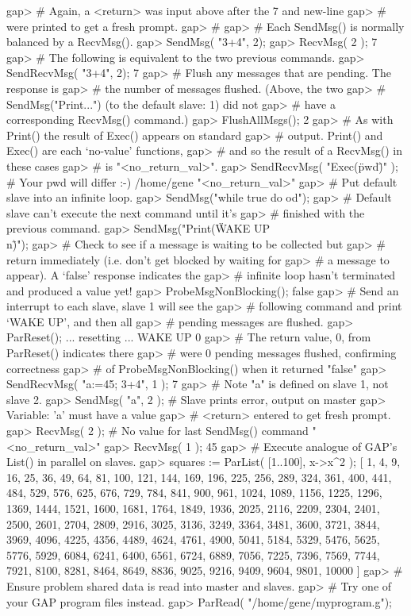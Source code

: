 gap> # Again, a <return> was input above after the 7 and new-line
gap> # were printed to get a fresh prompt.
gap> #
gap> # Each SendMsg() is normally balanced by a RecvMsg().
gap> SendMsg( "3+4", 2);
gap> RecvMsg( 2 );
7
gap> # The following is equivalent to the two previous commands.
gap> SendRecvMsg( "3+4", 2);
7
gap> # Flush any messages that are pending. The response is
gap> # the number of messages flushed. (Above, the two
gap> # SendMsg("Print...") (to the default slave: 1) did not
gap> # have a corresponding RecvMsg() command.)
gap> FlushAllMsgs();
2
gap> # As with Print() the result of Exec() appears on standard
gap> # output. Print() and Exec() are each `no-value' functions,
gap> # and so the result of a RecvMsg() in these cases
gap> # is "<no_return_val>".
gap> SendRecvMsg( "Exec(\"pwd\")" ); # Your pwd will differ :-)
/home/gene
"<no_return_val>"
gap> # Put default slave into an infinite loop.
gap> SendMsg("while true do od");
gap> # Default slave can't execute the next command until it's 
gap> # finished with the previous command.
gap> SendMsg("Print(\"WAKE UP\\n\")");
gap> # Check to see if a message is waiting to be collected but
gap> # return immediately (i.e. don't get blocked by waiting for
gap> # a message to appear). A `false' response indicates the
gap> # infinite loop hasn't terminated and produced a value yet!
gap> ProbeMsgNonBlocking();
false
gap> # Send an interrupt to each slave, slave 1 will see the
gap> # following command and print `WAKE UP', and then all
gap> # pending messages are flushed.
gap> ParReset();
... resetting ...
WAKE UP
0
gap> # The return value, 0, from ParReset() indicates there
gap> # were 0 pending messages flushed, confirming correctness
gap> # of ProbeMsgNonBlocking() when it returned "false"
gap> SendRecvMsg( "a:=45; 3+4", 1 );
7
gap> # Note "a" is defined on slave 1, not slave 2.
gap> SendMsg( "a", 2 ); # Slave prints error, output on master
gap>  Variable: 'a' must have a value
gap> # <return> entered to get fresh prompt.
gap> RecvMsg( 2 ); # No value for last SendMsg() command
"<no_return_val>"
gap> RecvMsg( 1 );
45
gap> # Execute analogue of GAP's List() in parallel on slaves.
gap> squares := ParList( [1..100], x->x^2 );
[ 1, 4, 9, 16, 25, 36, 49, 64, 81, 100, 121, 144, 169, 196, 225, 256, 
  289, 324, 361, 400, 441, 484, 529, 576, 625, 676, 729, 784, 841, 
  900, 961, 1024, 1089, 1156, 1225, 1296, 1369, 1444, 1521, 1600, 
  1681, 1764, 1849, 1936, 2025, 2116, 2209, 2304, 2401, 2500, 2601, 
  2704, 2809, 2916, 3025, 3136, 3249, 3364, 3481, 3600, 3721, 3844, 
  3969, 4096, 4225, 4356, 4489, 4624, 4761, 4900, 5041, 5184, 5329, 
  5476, 5625, 5776, 5929, 6084, 6241, 6400, 6561, 6724, 6889, 7056, 
  7225, 7396, 7569, 7744, 7921, 8100, 8281, 8464, 8649, 8836, 9025, 
  9216, 9409, 9604, 9801, 10000 ]
gap> # Ensure problem shared data is read into master and slaves.
gap> # Try one of your GAP program files instead.
gap> ParRead( "/home/gene/myprogram.g");

